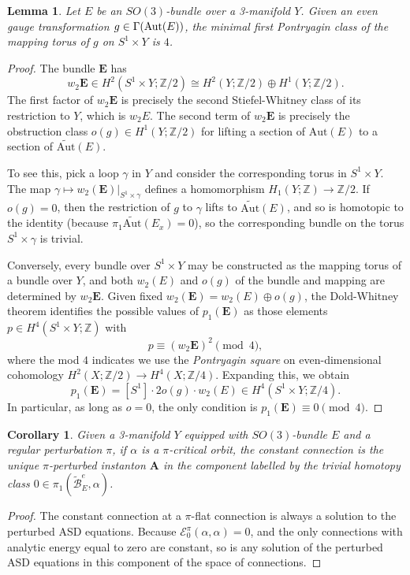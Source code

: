 \documentclass{memo-l}
\newtheorem{lemma}[theorem]{Lemma}
\newtheorem{corollary}[theorem]{Corollary}
\theoremstyle{definition}
\theoremstyle{remark}
\numberwithin{section}{chapter}
\numberwithin{equation}{chapter}
\begin{document}
\begin{lemma}Let $E$ be an $SO(3)$-bundle over a 3-manifold $Y$. Given an even gauge transformation $g \in \Gamma(\textup{Aut}(E))$, the minimal first Pontryagin class of the mapping torus of $g$ on $S^1 \times Y$ is $4$.\end{lemma}
\begin{proof}
The bundle $\mathbf{E}$ has 
$$w_2 \mathbf{E} \in H^2(S^1 \times Y;\mathbb Z/2) \cong H^2(Y;\mathbb Z/2) \oplus H^1(Y;\mathbb Z/2).$$ 
The first factor of $w_2 \mathbf{E}$ is precisely the second Stiefel-Whitney class of its restriction to $Y$, which is $w_2 E$. The second term of $w_2 \mathbf{E}$ is precisely the obstruction class $o(g) \in H^1(Y;\mathbb Z/2)$ for lifting a section of $\text{Aut}(E)$ to a section of $\widetilde{\text{Aut}}(E)$. 

To see this, pick a loop $\gamma$ in $Y$ and consider the corresponding torus in $S^1 \times Y$. The map $\gamma \mapsto w_2(\mathbf{E})\big|_{S^1 \times \gamma}$ defines a homomorphism $H_1(Y;\mathbb Z) \to \mathbb Z/2$. If $o(g) = 0$, then the restriction of $g$ to $\gamma$ lifts to $\widetilde{\text{Aut}}(E)$, and so is homotopic to the identity (because $\pi_1 \widetilde{\text{Aut}}(E_x) = 0$), so the corresponding bundle on the torus $S^1 \times \gamma$ is trivial. 

Conversely, every bundle over $S^1 \times Y$ may be constructed as the mapping torus of a bundle over $Y$, and both $w_2(E)$ and $o(g)$ of the bundle and mapping are determined by $w_2 \mathbf{E}$. Given fixed $w_2(\mathbf{E}) = w_2(E) \oplus o(g)$, the Dold-Whitney theorem identifies the possible values of $p_1(\mathbf{E})$ as those elements $p \in H^4(S^1 \times Y;\mathbb Z)$ with 
$$p \equiv (w_2 \mathbf{E})^2 \pmod 4,$$ 
where the mod $4$ indicates we use the \emph{Pontryagin square} on even-dimensional cohomology $H^2(X;\mathbb Z/2) \to H^4(X;\mathbb Z/4)$. Expanding this, we obtain 
$$p_1(\mathbf{E}) = [S^1] \cdot 2o(g) \cdot w_2(E) \in H^4(S^1 \times Y;\mathbb Z/4).$$
In particular, as long as $o = 0$, the only condition is $p_1(\mathbf{E}) \equiv 0 \pmod 4$. 
\end{proof}

\begin{corollary}\label{triv-component}Given a 3-manifold $Y$ equipped with $SO(3)$-bundle $E$ and a regular perturbation $\pi$, if $\alpha$ is a $\pi$-critical orbit, the constant connection is the unique $\pi$-perturbed instanton $\mathbf{A}$ in the component labelled by the trivial homotopy class $0 \in \pi_1(\widetilde{\mathcal B}^e_E,\alpha)$.
\end{corollary}
\begin{proof}
The constant connection at a $\pi$-flat connection is always a solution to the perturbed ASD equations. Because $\mathcal E^\pi_0(\alpha, \alpha) = 0$, and the only connections with analytic energy equal to zero are constant, so is any solution of the perturbed ASD equations in this component of the space of connections.
\end{proof}
\end{document}
